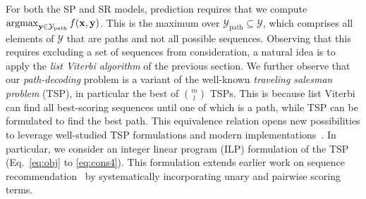 For both the SP and SR models, prediction requires that we compute $\operatorname*{argmax}_{\mathbf{y} \in \mathcal{Y}_{\mathrm{path}}} f( \mathbf{x}, \mathbf{y} )$.
This is the maximum over $\mathcal{Y}_{\mathrm{path}} \subseteq \mathcal{Y}$,
which comprises all elements of $\mathcal{Y}$ that are paths and not all possible sequences.
Observing that this requires excluding a set of sequences from consideration, a natural idea is to apply the \emph{list Viterbi algorithm} of the previous section.
We further observe that our {\em path-decoding} problem is a variant of the well-known
{\em traveling salesman problem} (TSP), in particular the best of ${m \choose l}$ TSPs.
This is because list Viterbi can find all best-scoring sequences until one of which is a path, while TSP can be formulated to find the best path.
This equivalence relation opens new possibilities to leverage well-studied TSP formulations
and modern implementations~\cite{tspbook2011}. In particular, we consider an integer linear program (ILP) formulation of the TSP (Eq.~\ref{eq:obj} to \ref{eq:cons4}). This formulation extends earlier work on sequence recommendation~\cite{lian2014geomf,cikm16paper} by systematically incorporating unary and pairwise scoring terms.




